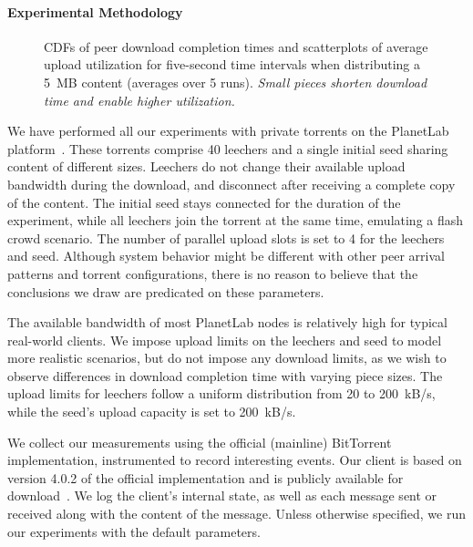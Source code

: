 \documentclass[twocolumn,letterpaper,11pt]{article}
\begin{document}
\paragraph{Experimental Methodology}

\begin{figure*}[t]
\centering
{}
\hfill{}
\hfill{}
\hfill{}
\caption{CDFs of peer download completion times and scatterplots of average
upload utilization for five-second time intervals when
distributing a 5~MB content (averages over 5 runs).
\emph{Small pieces shorten download time and enable higher utilization.}}
\label{fig:small_contents-cdfs_utilization}
\end{figure*}

We have performed all our experiments with private torrents on the PlanetLab 
platform~\cite{planetlab}. 
These torrents comprise 40 leechers and a single initial seed sharing content of 
different sizes. Leechers do not change their available upload bandwidth during the 
download, and disconnect after receiving a complete copy of the content. 
The initial seed stays connected for the duration of the experiment, while all leechers 
join the torrent at the same time, emulating a flash crowd scenario. 
The number of parallel upload slots is set to 4 for the leechers and seed.
Although system behavior might be different with other peer arrival patterns and torrent 
configurations, there is no reason to believe that the conclusions we draw are predicated 
on these parameters.

The available bandwidth of most PlanetLab nodes is relatively high for typical real-world clients.
We impose upload limits on the leechers and seed to model more realistic scenarios,
but do not impose any download limits, as we wish to observe differences in download completion time
with varying piece sizes. 
The upload limits for leechers follow
a uniform distribution from 20 to 200~kB/s, while the seed's upload capacity is 
set to 200~kB/s.

We collect our measurements using the official (mainline) BitTorrent 
implementation, instrumented to record interesting events.
Our client is based on version 4.0.2 of the official implementation
and is publicly available for download~\cite{btinstrumented}.
We log the client's internal state, as well as each message sent or received along with the 
content of the 
message. Unless otherwise specified, we run our 
experiments with the default parameters.
\end{document}
